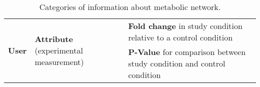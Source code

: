 \begin{table}[htbp]
\begin{tabular}{ |m{2cm}|m{4cm}|m{10cm}| }


\\ \hline
\multirow{2}{2cm}{\textbf{User}}
& \multirow{2}{4cm}{\textbf{Attribute} (experimental measurement)}
& \textbf{Fold change} in study condition relative to a control condition
\\ \cline{3-3}
& & \textbf{P-Value} for comparison between study condition and control condition

\\ \hline
\end{tabular}
\caption{Categories of information about metabolic network.}
\label{table:information}
\end{table}

